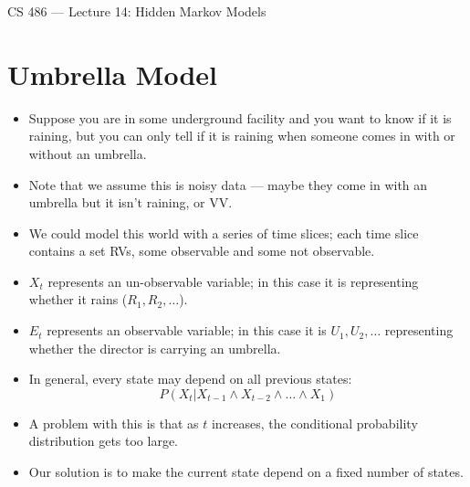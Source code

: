 \documentclass{article}
\author{Clement Tsang}
\begin{document}
\begin{center}
    \Large{CS 486 --- Lecture 14: Hidden Markov Models}
\end{center}

\section{Umbrella Model}
\begin{itemize}
    \item Suppose you are in some underground facility and you want to know if it is raining, but you can only tell if it is raining when someone comes in with or without an umbrella.
    \item Note that we assume this is noisy data --- maybe they come in with an umbrella but it isn't raining, or VV.
    \item We could model this world with a series of time slices; each time slice contains a set RVs, some observable and some not observable.
    \item $X_t$ represents an un-observable variable; in this case it is representing whether it rains ($R_1, R_2, \dots$).
    \item $E_t$ represents an observable variable; in this case it is $U_1, U_2, \dots$ representing whether the director is carrying an umbrella.
    \item In general, every state may depend on all previous states:
        \[
            P(X_t | X_{t-1} \wedge X_{t-2} \wedge \dots \wedge X_1)
        \]
    \item A problem with this is that as $t$ increases, the conditional probability distribution gets too large.
    \item Our solution is to make the current state depend on a fixed number of states.
\end{itemize}
\end{document}
